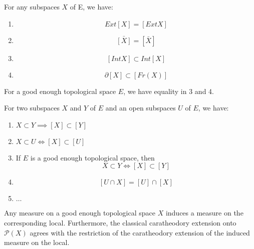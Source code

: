 
\begin{lemma}[Part 3]
    \label{lem:subspaces_part_3}
    For any subspaces $X$ of E, we have:
    \begin{enumerate}
        \item \[Ext[X] = [Ext X]\]
        \item \[\bar{[X]} = [\bar{X}]\]
        \item \[[Int X] \subset Int[X]\]
        \item \[\partial[X] \subset [Fr(X)]\]
    \end{enumerate}
    For a good enough topological space $E$, we have equality in 3 and 4.
\end{lemma}


\begin{proposition}
    \label{prop:subset_to_sublocal_structure}
    For two subspaces $X$ and $Y$ of $E$ and an open subspaces $U$ of $E$, we have:
    \begin{enumerate}
        \item $X \subset Y \implies [X] \subset [Y]$
        \item $X \subset U \iff [X] \subset [U]$
        \item If $E$ is a good enough topological space, then \[X \subset Y \iff [X] \subset [Y]\]
        \item \[[U \cap X] = [U] \cap [X]\]
        \item $\dots$
    \end{enumerate}

\end{proposition}

\begin{theorem}
    \label{thm:measure_top_to_loc}
    Any measure on a good enough topological space $X$ induces a measure on the corresponding local. Furthermore, the classical caratheodory extension onto $\mathcal{P}(X)$ agrees with the restriction of the caratheodory extension of the induced measure on the local.
\end{theorem}



